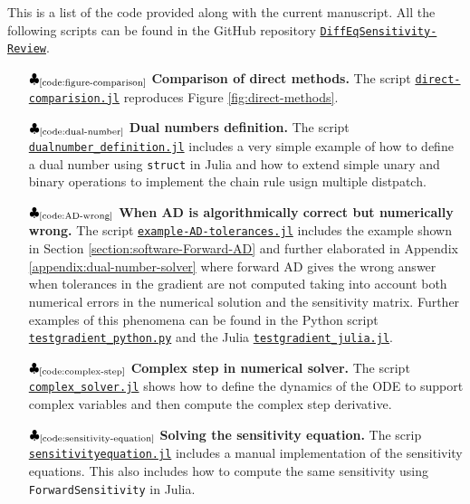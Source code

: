 This is a list of the code provided along with the current manuscript.
All the following scripts can be found in the GitHub repository \href{https://github.com/ODINN-SciML/DiffEqSensitivity-Review}{\texttt{DiffEqSensitivity-Review}}. 
 
\begin{itemize}
    \item[$\clubsuit_\text{\ref{code:figure-comparison}}$] \textbf{Comparison of direct methods.} The script \href{https://github.com/ODINN-SciML/DiffEqSensitivity-Review/blob/main/code/DirectMethods/Comparison/direct-comparision.jl}{\texttt{direct-comparision.jl}} reproduces Figure \ref{fig:direct-methods}.
    \item[$\clubsuit_\text{\ref{code:dual-number}}$] \textbf{Dual numbers definition.} The script \href{https://github.com/ODINN-SciML/DiffEqSensitivity-Review/blob/main/code/DirectMethods/DualNumbers/dualnumber_definition.jl}{\texttt{dualnumber\_definition.jl}} includes a very simple example of how to define a dual number using \texttt{struct} in Julia and how to extend simple unary and binary operations to implement the chain rule usign multiple distpatch. 
    \item[$\clubsuit_\text{\ref{code:AD-wrong}}$] \textbf{When AD is algorithmically correct but numerically wrong.} The script \href{https://github.com/ODINN-SciML/DiffEqSensitivity-Review/blob/main/code/SensitivityForwardAD/example-AD-tolerances.jl}{\texttt{example-AD-tolerances.jl}} includes the example shown in Section \ref{section:software-Forward-AD} and further elaborated in Appendix \ref{appendix:dual-number-solver} where forward AD gives the wrong answer when tolerances in the gradient are not computed taking into account both numerical errors in the numerical solution and the sensitivity matrix. Further examples of this phenomena can be found in the Python script \href{https://github.com/ODINN-SciML/DiffEqSensitivity-Review/blob/main/code/SensitivityForwardAD/testgradient_python.py}{\texttt{testgradient\_python.py}} and the Julia \href{https://github.com/ODINN-SciML/DiffEqSensitivity-Review/blob/main/code/SensitivityForwardAD/testgradient_julia.jl}{\texttt{testgradient\_julia.jl}}.
    \item[$\clubsuit_\text{\ref{code:complex-step}}$] \textbf{Complex step in numerical solver.} The script \href{https://github.com/ODINN-SciML/DiffEqSensitivity-Review/blob/main/code/DirectMethods/ComplexStep/complex_solver.jl}{\texttt{complex\_solver.jl}} shows how to define the dynamics of the ODE to support complex variables and then compute the complex step derivative. 
    \item[$\clubsuit_\text{\ref{code:sensitivity-equation}}$] \textbf{Solving the sensitivity equation. } The scrip \href{https://github.com/ODINN-SciML/DiffEqSensitivity-Review/blob/main/code/SolverMethods/sensitivityequation.jl}{\texttt{sensitivityequation.jl}} includes a manual implementation of the sensitivity equations. This also includes how to compute the same sensitivity using \texttt{ForwardSensitivity} in Julia.  
\end{itemize}
